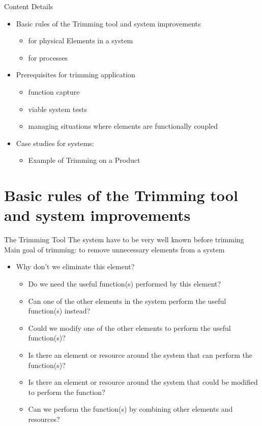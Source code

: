 \documentclass{beamer}
\begin{document}
	\begin{frame}{Content Details}
		\begin{itemize}
			\item Basic rules of the Trimming tool and system improvements
    		\begin{itemize}
    			\item for physical Elements in a system
    			\item for processes
    		\end{itemize}
			\item Prerequisites for trimming application
    		\begin{itemize}
    			\item function capture
    			\item viable system tests
    			\item managing situations where elements are functionally coupled
    		\end{itemize}
			\item Case studies for systems:
    		\begin{itemize}
    			\item Example of Trimming on a Product
    		\end{itemize}
		\end{itemize}
	\end{frame}
	
	\section{Basic rules of the Trimming tool and system improvements}
	
	\begin{frame}{The Trimming Tool}
	The system have to be very well known before trimming \\
	Main goal of trimming: to remove unnecessary elements from a system
		\begin{itemize}
			\item Why don’t we eliminate this element?
			\begin{itemize}
    			\item Do we need the useful function(s) performed by this element?
    			\item Can one of the other elements in the system perform the useful function(s) instead?
    			\item Could we modify one of the other elements to perform the useful function(s)?
    			\item Is there an element or resource around the system that can perform the function(s)?
    			\item Is there an element or resource around the system that could be modified to perform the function?
    			\item Can we perform the function(s) by combining other elements and resources?
		    \end{itemize}
		\end{itemize}
	\end{frame}
	
\end{document}
